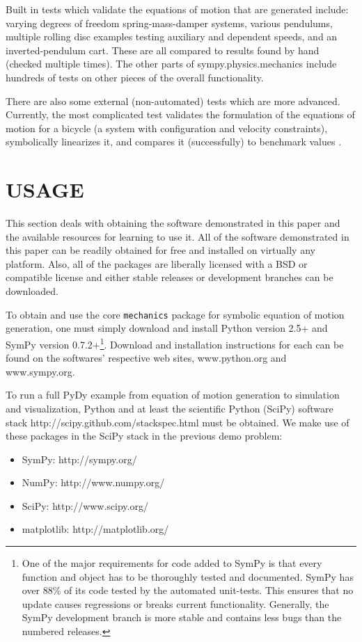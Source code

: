 \documentclass[twocolumn,10pt]{asme2e}
\begin{document}
Built in tests which validate the equations of motion that are generated
include: varying degrees of freedom spring-mass-damper systems, various
pendulums, multiple rolling disc examples testing auxiliary and dependent
speeds, and an inverted-pendulum cart. These are all compared to results found
by hand (checked multiple times). The other parts of sympy.physics.mechanics
include hundreds of tests on other pieces of the overall functionality.

There are also some external (non-automated) tests which are more advanced.
Currently, the most complicated test validates the formulation of the equations
of motion for a bicycle (a system with configuration and velocity constraints),
symbolically linearizes it, and compares it (successfully) to benchmark values
\cite{Meijaard2007}.

\section*{USAGE}
This section deals with obtaining the software demonstrated in this paper and
the available resources for learning to use it. All of the software
demonstrated in this paper can be readily obtained for free and installed on
virtually any platform. Also, all of the packages are liberally licensed with a
BSD or compatible license and either stable releases or development branches
can be downloaded.

To obtain and use the core \verb|mechanics| package for symbolic equation of
motion generation, one must simply download and install Python version 2.5+ and
SymPy version 0.7.2+\footnote{One of the major requirements for code added to
SymPy is that every function and object has to be thoroughly tested and
documented. SymPy has over 88\% of its code tested by the automated unit-tests.
This ensures that no update causes regressions or breaks current functionality.
Generally, the SymPy development branch is more stable and contains less bugs
than the numbered releases.}. Download and installation instructions for each
can be found on the softwares' respective web sites, www.python.org and
www.sympy.org.

To run a full PyDy example from equation of motion generation to simulation and
visualization, Python and at least the scientific Python (SciPy) software stack
http://scipy.github.com/stackspec.html must be obtained. We make use of these
packages in the SciPy stack in the previous demo problem:
%
\begin{itemize}
  \item SymPy: http://sympy.org/
  \item NumPy: http://www.numpy.org/
  \item SciPy: http://www.scipy.org/
  \item matplotlib: http://matplotlib.org/
\end{itemize}
\end{document}
